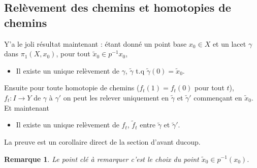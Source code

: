 \documentclass[a4paper,12pt]{article}
\theoremstyle{plain}
\newtheorem{rem}{Remarque}
\theoremstyle{definition}
\theoremstyle{remark}
\begin{document}
\subsection{Relèvement des chemins et homotopies de chemins}
Y'a le joli résultat maintenant : étant donné un point 
base $x_0\in X$
et un lacet $\gamma$ dans $\pi_1(X,x_0)$, pour tout 
$\tilde x_0\in p^{-1}x_0$,
\begin{itemize}
  \item Il existe un unique relèvement de $\gamma$, $\tilde \gamma$
    t.q $\tilde\gamma(0)=\tilde x_0$.
\end{itemize}
Ensuite pour toute homotopie de chemins ($f_t(1)=f_t(0)$
pour tout $t$), $f_t\colon I\to Y$ de $\gamma$ à
$\gamma'$ on peut les relever uniquement en 
$\tilde \gamma$ et $\tilde \gamma'$ commençant en 
$\tilde x_0$. Et maintenant 
\begin{itemize}
  \item Il existe un unique relèvement de $f_t$, 
    $\tilde f_t$ entre $\tilde\gamma$ et $\tilde\gamma'$.
\end{itemize}
La preuve est un corollaire direct de la section d'avant
ducoup.

\begin{rem}
  Le point clé à remarquer c'est le choix du point
  $\tilde x_0\in p^{-1}(x_0)$.
\end{rem}


\end{document}
